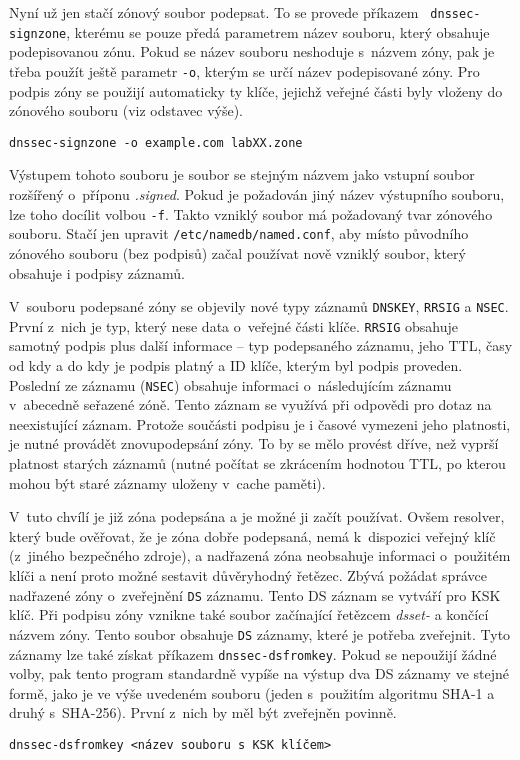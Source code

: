 Nyní už jen stačí zónový soubor podepsat. To se provede příkazem {\tt
dnssec-signzone}, kterému se pouze předá parametrem název souboru, který obsahuje podepisovanou zónu. Pokud se název souboru neshoduje s~názvem zóny, pak je třeba použít ještě parametr {\tt -o}, kterým se určí název podepisované zóny. Pro podpis zóny se použijí automaticky ty klíče, jejichž veřejné části byly vloženy do zónového souboru (viz odstavec výše).
\begin{verbatim}
dnssec-signzone -o example.com labXX.zone
\end{verbatim}
Výstupem tohoto souboru je soubor se stejným názvem jako vstupní soubor rozšířený o~příponu {\em .signed}. Pokud je požadován jiný název výstupního souboru, lze toho docílit volbou {\tt -f}. Takto vzniklý soubor má požadovaný tvar zónového souboru. Stačí jen upravit {\tt /etc/namedb/named.conf}, aby místo původního zónového souboru (bez podpisů) začal používat nově vzniklý soubor, který obsahuje i podpisy záznamů.

V~souboru podepsané zóny se objevily nové typy záznamů {\tt DNSKEY}, {\tt RRSIG} a {\tt NSEC}. První z~nich je typ, který nese data o~veřejné části klíče. {\tt RRSIG} obsahuje samotný podpis plus další informace -- typ podepsaného záznamu, jeho TTL, časy od kdy a do kdy je podpis platný a ID klíče, kterým byl podpis proveden. Poslední ze záznamu ({\tt NSEC}) obsahuje informaci o~následujícím záznamu v~abecedně seřazené zóně. Tento záznam se využívá při odpovědi pro dotaz na neexistující záznam. Protože součásti podpisu je i časové vymezeni jeho platnosti, je nutné provádět znovupodepsání zóny. To by se mělo provést dříve, než vyprší platnost starých záznamů (nutné počítat se zkrácením hodnotou TTL, po kterou mohou být staré záznamy uloženy v~cache paměti).

V~tuto chvílí je již zóna podepsána a je možné ji začít používat. Ovšem resolver, který bude ověřovat, že je zóna dobře podepsaná, nemá k~dispozici veřejný klíč (z~jiného bezpečného zdroje), a nadřazená zóna neobsahuje informaci o~použitém klíči a není proto možné sestavit důvěryhodný řetězec. Zbývá požádat správce nadřazené zóny o~zveřejnění {\tt DS} záznamu. Tento DS záznam se vytváří pro KSK klíč. Při podpisu zóny vznikne také soubor začínající řetězcem {\em dsset-} a končící názvem zóny. Tento soubor obsahuje {\tt DS} záznamy, které je potřeba zveřejnit. Tyto záznamy lze také získat příkazem {\tt dnssec-dsfromkey}. Pokud se nepoužijí žádné volby, pak tento program standardně vypíše na výstup dva DS záznamy ve stejné formě, jako je ve výše uvedeném souboru (jeden s~použitím algoritmu SHA-1 a druhý s~SHA-256). První z~nich by měl být zveřejněn povinně.
\begin{verbatim}
dnssec-dsfromkey <název souboru s KSK klíčem>
\end{verbatim}


